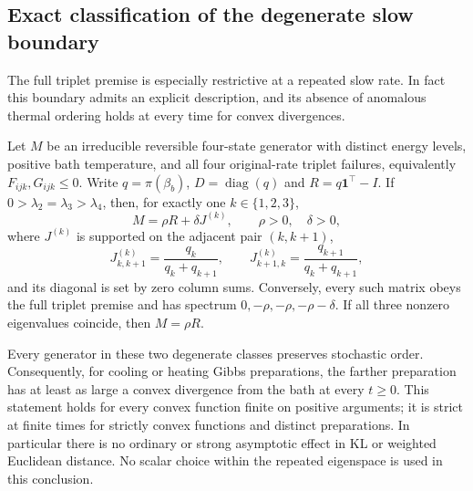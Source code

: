 \subsection{Exact classification of the degenerate slow boundary}
\label{sec:fulltripletdegenerate}
The full triplet premise is especially restrictive at a repeated slow
rate. In fact this boundary admits an explicit description, and its
absence of anomalous thermal ordering holds at every time for convex
divergences.

\begin{theorem}
\label{thm:tripletdegenerate}
Let $M$ be an irreducible reversible four-state generator with distinct
energy levels, positive bath temperature, and all four original-rate
triplet failures, equivalently $F_{ijk},G_{ijk}\leq0$.
Write $q=\pi(\beta_b)$, $D=\operatorname{diag}(q)$ and
$R=q\mathbf1^\top-I$. If
$0>\lambda_2=\lambda_3>\lambda_4$, then, for exactly one
$k\in\{1,2,3\}$,
\[
M=\rho R+\delta J^{(k)},\qquad \rho>0,\quad\delta>0,
\]
where $J^{(k)}$ is supported on the adjacent pair $(k,k+1)$,
\[
J^{(k)}_{k,k+1}=\frac{q_k}{q_k+q_{k+1}},\qquad
J^{(k)}_{k+1,k}=\frac{q_{k+1}}{q_k+q_{k+1}},
\]
and its diagonal is set by zero column sums. Conversely, every such
matrix obeys the full triplet premise and has spectrum
$0,-\rho,-\rho,-\rho-\delta$.
If all three nonzero eigenvalues coincide, then $M=\rho R$.

Every generator in these two degenerate classes preserves stochastic
order. Consequently, for cooling or heating Gibbs preparations, the
farther preparation has at least as large a convex divergence from the
bath at every $t\geq0$. This statement holds for every convex function
finite on positive arguments; it is strict at finite times for strictly
convex functions and distinct preparations. In particular there is no
ordinary or strong asymptotic effect in KL or weighted Euclidean distance.
No scalar choice within the repeated eigenspace is used in this conclusion.
\end{theorem}
